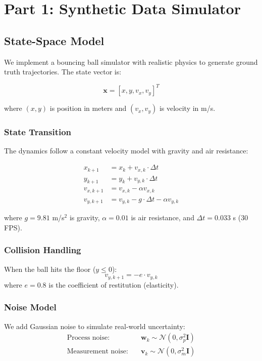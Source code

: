 \documentclass[11pt]{article}
\begin{document}
\section{Part 1: Synthetic Data Simulator}

\subsection{State-Space Model}

We implement a bouncing ball simulator with realistic physics to generate ground truth trajectories. The state vector is:

\begin{equation}
\mathbf{x} = [x, y, v_x, v_y]^T
\end{equation}

where $(x, y)$ is position in meters and $(v_x, v_y)$ is velocity in m/s.

\subsubsection{State Transition}
The dynamics follow a constant velocity model with gravity and air resistance:

\begin{align}
x_{k+1} &= x_k + v_{x,k} \cdot \Delta t \\
y_{k+1} &= y_k + v_{y,k} \cdot \Delta t \\
v_{x,k+1} &= v_{x,k} - \alpha v_{x,k} \\
v_{y,k+1} &= v_{y,k} - g \cdot \Delta t - \alpha v_{y,k}
\end{align}

where $g = 9.81$ m/s$^2$ is gravity, $\alpha = 0.01$ is air resistance, and $\Delta t = 0.033$ s (30 FPS).

\subsubsection{Collision Handling}
When the ball hits the floor ($y \leq 0$):
\begin{equation}
v_{y,k+1} = -e \cdot v_{y,k}
\end{equation}
where $e = 0.8$ is the coefficient of restitution (elasticity).

\subsubsection{Noise Model}
We add Gaussian noise to simulate real-world uncertainty:
\begin{align}
\text{Process noise:} \quad &\mathbf{w}_k \sim \mathcal{N}(0, \sigma_p^2 \mathbf{I}) \\
\text{Measurement noise:} \quad &\mathbf{v}_k \sim \mathcal{N}(0, \sigma_m^2 \mathbf{I})
\end{align}
\end{document}
